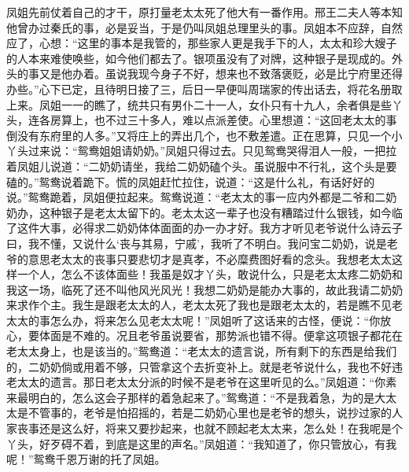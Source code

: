 \begin{parag}
    凤姐先前仗着自己的才干，原打量老太太死了他大有一番作用。邢王二夫人等本知他曾办过秦氏的事，必是妥当，于是仍叫凤姐总理里头的事。凤姐本不应辞，自然应了，心想：“这里的事本是我管的，那些家人更是我手下的人，太太和珍大嫂子的人本来难使唤些，如今他们都去了。银项虽没有了对牌，这种银子是现成的。外头的事又是他办着。虽说我现今身子不好，想来也不致落褒贬，必是比宁府里还得办些。”心下已定，且待明日接了三，后日一早便叫周瑞家的传出话去，将花名册取上来。凤姐一一的瞧了，统共只有男仆二十一人，女仆只有十九人，余者俱是些丫头，连各房算上，也不过三十多人，难以点派差使。心里想道：“这回老太太的事倒没有东府里的人多。”又将庄上的弄出几个，也不敷差遣。正在思算，只见一个小丫头过来说：“鸳鸯姐姐请奶奶。”凤姐只得过去。只见鸳鸯哭得泪人一般，一把拉着凤姐儿说道：“二奶奶请坐，我给二奶奶磕个头。虽说服中不行礼，这个头是要磕的。”鸳鸯说着跪下。慌的凤姐赶忙拉住，说道：“这是什么礼，有话好好的说。”鸳鸯跪着，凤姐便拉起来。鸳鸯说道：“老太太的事一应内外都是二爷和二奶奶办，这种银子是老太太留下的。老太太这一辈子也没有糟踏过什么银钱，如今临了这件大事，必得求二奶奶体体面面的办一办才好。我方才听见老爷说什么诗云子曰，我不懂，又说什么‘丧与其易，宁戚’，我听了不明白。我问宝二奶奶，说是老爷的意思老太太的丧事只要悲切才是真孝，不必糜费图好看的念头。我想老太太这样一个人，怎么不该体面些！我虽是奴才丫头，敢说什么，只是老太太疼二奶奶和我这一场，临死了还不叫他风光风光！我想二奶奶是能办大事的，故此我请二奶奶来求作个主。我生是跟老太太的人，老太太死了我也是跟老太太的，若是瞧不见老太太的事怎么办，将来怎么见老太太呢！”凤姐听了这话来的古怪，便说：“你放心，要体面是不难的。况且老爷虽说要省，那势派也错不得。便拿这项银子都花在老太太身上，也是该当的。”鸳鸯道：“老太太的遗言说，所有剩下的东西是给我们的，二奶奶倘或用着不够，只管拿这个去折变补上。就是老爷说什么，我也不好违老太太的遗言。那日老太太分派的时候不是老爷在这里听见的么。”凤姐道：“你素来最明白的，怎么这会子那样的着急起来了。”鸳鸯道：“不是我着急，为的是大太太是不管事的，老爷是怕招摇的，若是二奶奶心里也是老爷的想头，说抄过家的人家丧事还是这么好，将来又要抄起来，也就不顾起老太太来，怎么处！在我呢是个丫头，好歹碍不着，到底是这里的声名。”凤姐道：“我知道了，你只管放心，有我呢！”鸳鸯千恩万谢的托了凤姐。
\end{parag}


